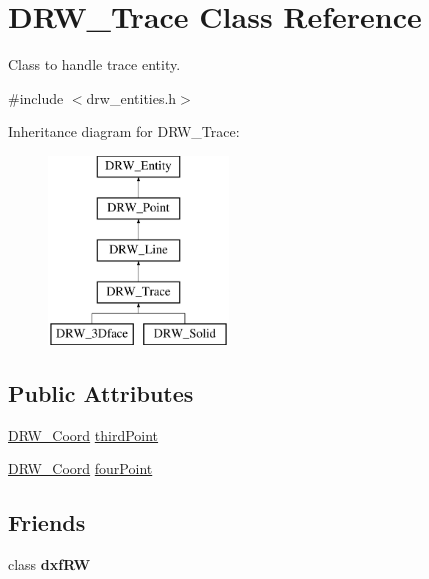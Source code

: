 \hypertarget{class_d_r_w___trace}{}\section{D\+R\+W\+\_\+\+Trace Class Reference}
\label{class_d_r_w___trace}


Class to handle trace entity.  




{\ttfamily \#include $<$drw\+\_\+entities.\+h$>$}

Inheritance diagram for D\+R\+W\+\_\+\+Trace\+:\begin{figure}[H]
\begin{center}
\leavevmode
\includegraphics[height=5.000000cm]{d2/d52/class_d_r_w___trace}
\end{center}
\end{figure}
\subsection*{Public Attributes}
\begin{DoxyCompactItemize}
\item 
\hyperlink{class_d_r_w___coord}{D\+R\+W\+\_\+\+Coord} \hyperlink{class_d_r_w___trace_adadabbf354ee19cfe3869c790e6de3ec}{third\+Point}
\item 
\hyperlink{class_d_r_w___coord}{D\+R\+W\+\_\+\+Coord} \hyperlink{class_d_r_w___trace_a96d7a3b877a7f26f6a8b8cdbc9ced660}{four\+Point}
\end{DoxyCompactItemize}
\subsection*{Friends}
\begin{DoxyCompactItemize}
\item 
\hypertarget{class_d_r_w___trace_a7f080e77e5112f8364c61b97387f8ee2}{}class {\bfseries dxf\+R\+W}\label{class_d_r_w___trace_a7f080e77e5112f8364c61b97387f8ee2}

\end{DoxyCompactItemize}
